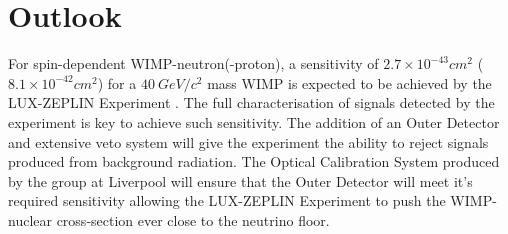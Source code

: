 \section{Outlook}
For spin-dependent WIMP-neutron(-proton), a sensitivity of $2.7\times10^{-43}cm^{2}$ ($8.1\times10^{-42}cm^{2}$) for a $40\:GeV/c^2$ mass WIMP is expected to be achieved by the LUX-ZEPLIN Experiment \cite{WIMPsense}. The full characterisation of signals detected by the experiment is key to achieve such sensitivity. The addition of an Outer Detector and extensive veto system will give the experiment the ability to reject signals produced from background radiation. The Optical Calibration System produced by the group at Liverpool will ensure that the Outer Detector will meet it's required sensitivity allowing the LUX-ZEPLIN Experiment to push the WIMP-nuclear cross-section ever close to the neutrino floor. 